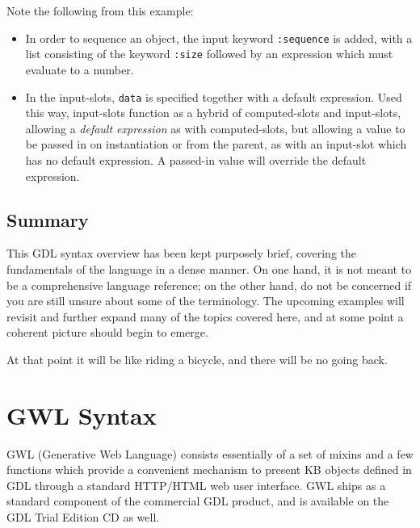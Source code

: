 \documentclass [11pt]{book}
\begin{document}
Note the following from this example:

\begin{itemize}

\item In order to sequence an object, the input keyword \texttt{:sequence} is added, with a list consisting of the keyword \texttt{:size} followed by an expression which must evaluate to a number.

\item In the input-slots, \texttt{data} is specified together with a default expression. Used this way, 
input-slots function as a hybrid of computed-slots and input-slots, allowing a \emph{default expression} as with computed-slots, but allowing a value to be passed in on 
instantiation or from the parent, as with an input-slot which has no default expression. 
A passed-in value will override the default expression.

\end{itemize}



\section{Summary}

\label{sec:summary}

This GDL syntax overview has been kept purposely brief, covering the fundamentals of the language
in a dense manner. On one hand, it is not meant to be a comprehensive language reference; on the other
hand, do not be concerned if you are still unsure about some of the terminology. The upcoming examples 
will revisit and further expand many of the topics covered here, and at some point a coherent picture 
should begin to emerge.

At that point it will be like riding a bicycle, and there will be no going back.



\chapter{GWL Syntax}

\label{chap:gwlsyntax}

GWL (Generative Web Language) consists essentially of a set of mixins and
a few functions which provide a convenient mechanism to present KB objects
defined in GDL through a standard HTTP/HTML web user interface. GWL ships
as a standard component of the commercial GDL product, and is available
on the GDL Trial Edition CD as well. 
\end{document}
